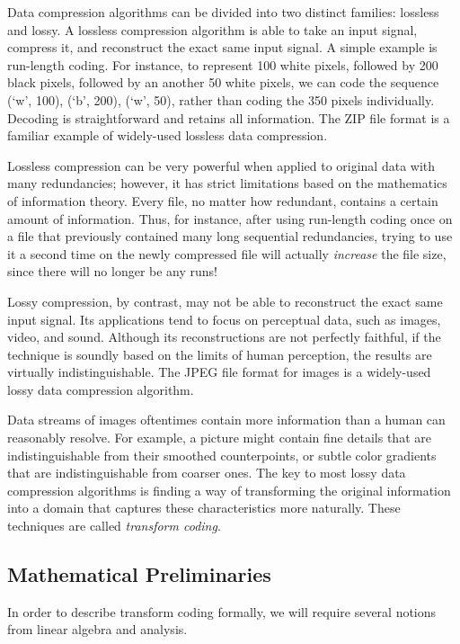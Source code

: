 Data compression algorithms can be divided into two distinct families: lossless and lossy. A lossless compression algorithm is able to take an input signal, compress it, and reconstruct the exact same input signal. A simple example is run-length coding. For instance, to represent 100 white pixels, followed by 200 black pixels, followed by an another 50 white pixels, we can code the sequence (`w', 100), (`b', 200), (`w', 50), rather than coding the 350 pixels individually. Decoding is straightforward and retains all information. The ZIP file format is a familiar example of widely-used lossless data compression.

Lossless compression can be very powerful when applied to original data with many redundancies; however, it has strict limitations based on the mathematics of information theory. Every file, no matter how redundant, contains a certain amount of information. Thus, for instance, after using run-length coding once on a file that previously contained many long sequential redundancies, trying to use it a second time on the newly compressed file will actually {\em increase} the file size, since there will no longer be any runs!

Lossy compression, by contrast, may not be able to reconstruct the exact same input signal. Its applications tend to focus on perceptual data, such as images, video, and sound. Although its reconstructions are not perfectly faithful, if the technique is soundly based on the limits of human perception, the results are virtually indistinguishable. The JPEG file format for images is a widely-used lossy data compression algorithm.

Data streams of images oftentimes contain more information than a human can reasonably resolve. For example, a picture might contain fine details that are indistinguishable from their smoothed counterpoints, or subtle color gradients that are indistinguishable from coarser ones. The key to most lossy data compression algorithms is finding a way of transforming the original information into a domain that captures these characteristics more naturally. These techniques are called {\em transform coding}.

\subsection{Mathematical Preliminaries}
In order to describe transform coding formally, we will require several notions from linear algebra and analysis.
